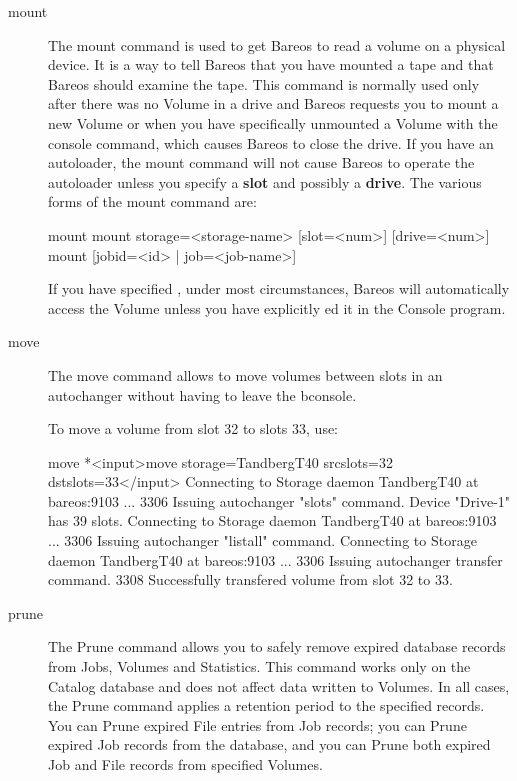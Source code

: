 \begin{description}
\item [mount]
   The mount command is used to get Bareos to read a volume on a physical
   device.  It is a way to tell Bareos that you have mounted a tape and
   that Bareos should examine the tape.  This command is normally
   used only after there was no Volume in a drive and Bareos requests you to mount a new
   Volume or when you have specifically unmounted a Volume with the 
   console command, which causes Bareos to close the drive.  If
   you have an autoloader, the mount command will not cause Bareos to
   operate the autoloader unless you specify a {\bf slot} and possibly a
   {\bf drive}. The various forms of the mount command are:

\begin{bconsole}{mount}
mount storage=<storage-name> [slot=<num>] [drive=<num>]
mount [jobid=<id> | job=<job-name>]
\end{bconsole}

   If you have specified ,
   under most circumstances, Bareos will automatically access
   the Volume unless you have explicitly ed it in  the Console
   program.

\item [move]
   The move command allows to move volumes between slots in an autochanger without
   having to leave the bconsole.

   To move a volume from slot 32 to slots 33, use:

\begin{bconsole}{move}
*<input>move storage=TandbergT40 srcslots=32 dstslots=33</input>
Connecting to Storage daemon TandbergT40 at bareos:9103 ...
3306 Issuing autochanger "slots" command.
Device "Drive-1" has 39 slots.
Connecting to Storage daemon TandbergT40 at bareos:9103 ...
3306 Issuing autochanger "listall" command.
Connecting to Storage daemon TandbergT40 at bareos:9103 ...
3306 Issuing autochanger transfer command.
3308 Successfully transfered volume from slot 32 to 33.
\end{bconsole}

\item [prune]
   \label{ManualPruning}
   The Prune command allows you to safely remove expired database records from
   Jobs, Volumes and Statistics.  This command works only on the Catalog
   database and does not affect data written to Volumes.  In all cases, the
   Prune command applies a retention period to the specified records.  You can
   Prune expired File entries from Job records; you can Prune expired Job
   records from the database, and you can Prune both expired Job and File
   records from specified Volumes.


\end{description}
